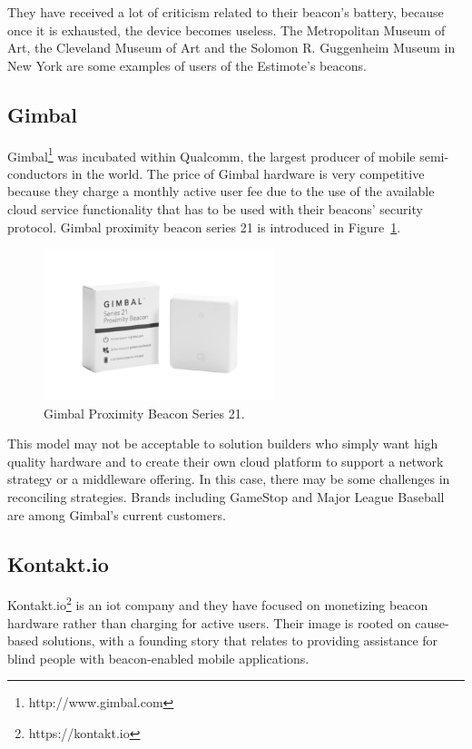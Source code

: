 They have received a lot of criticism related to their beacon’s battery, because once it is exhausted, the device becomes useless.
The Metropolitan Museum of Art, the Cleveland Museum of Art and the Solomon R. Guggenheim Museum in New York are some examples of users of the Estimote’s beacons.

\subsection{Gimbal} 
\label{subsection:gimbal}
Gimbal\footnote{http://www.gimbal.com} was incubated within Qualcomm, the largest producer of mobile semi-conductors in the world. 
The price of Gimbal hardware is very competitive because they charge a monthly active user fee due to the use of the available cloud service functionality that has to be used with their beacons' security protocol. Gimbal proximity beacon series 21 is introduced in Figure~\ref{fig:gimbalbeacon}.

\begin{figure}[!htb]
  \centering
  \includegraphics[width=0.6\textwidth]{Figures/gimbal_data.png}
  \caption[Gimbal Proximity Beacon Series 21]{Gimbal Proximity Beacon Series 21.}
  \label{fig:gimbalbeacon}
\end{figure}

This model may not be acceptable to solution builders who simply want high quality hardware and to create their own cloud platform to support a network strategy or a middleware offering. In this case, there may be some challenges in reconciling strategies.
Brands including GameStop and Major League Baseball are among Gimbal’s current customers.

\subsection{Kontakt.io} 
\label{subsection:kontakt}
Kontakt.io\footnote{https://kontakt.io} is an \gls{iot} company and they have focused on monetizing beacon hardware rather than charging for active users. Their image is rooted on cause-based solutions, with a founding story that relates to providing assistance for blind people with beacon-enabled mobile applications. 

